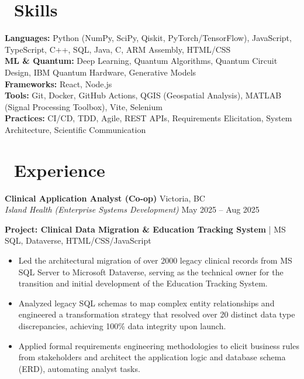 \documentclass[11pt]{article}
\begin{document}
\section*{\faCode\ Skills}
\small
\textbf{Languages:} Python (NumPy, SciPy, Qiskit, PyTorch/TensorFlow), JavaScript, TypeScript, C++, SQL, Java, C, ARM Assembly, HTML/CSS \\
\textbf{ML \& Quantum:} Deep Learning, Quantum Algorithms, Quantum Circuit Design, IBM Quantum Hardware, Generative Models \\
\textbf{Frameworks:} React, Node.js \\
\textbf{Tools:} Git, Docker, GitHub Actions, QGIS (Geospatial Analysis), MATLAB (Signal Processing Toolbox), Vite, Selenium \\
\textbf{Practices:} CI/CD, TDD, Agile, REST APIs, Requirements Elicitation, System Architecture, Scientific Communication \\

\vspace{-10pt}

\section*{\faBriefcase\ Experience}

\textbf{Clinical Application Analyst (Co-op)} \hfill Victoria, BC\\
\textit{Island Health (Enterprise Systems Development)} \hfill May 2025 -- Aug 2025

\vspace{2pt}

\noindent\textbf{\color{primaryColor}Project: Clinical Data Migration \& Education Tracking System} | MS SQL, Dataverse, HTML/CSS/JavaScript
\begin{itemize}
    \item Led the architectural migration of over 2000 legacy clinical records from MS SQL Server to Microsoft Dataverse, serving as the technical owner for the transition and initial development of the Education Tracking System.
    \item Analyzed legacy SQL schemas to map complex entity relationships and engineered a transformation strategy that resolved over 20 distinct data type discrepancies, achieving 100\% data integrity upon launch.
    \item Applied formal requirements engineering methodologies to elicit business rules from stakeholders and architect the application logic and database schema (ERD), automating analyst tasks.
\end{itemize}
\end{document}
